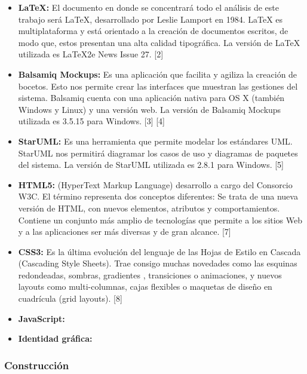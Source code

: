 	\begin{itemize}
		\item \textbf{LaTeX:} El documento en donde se concentrará todo el análisis de este trabajo será LaTeX, desarrollado por Leslie Lamport en 1984. LaTeX es multiplataforma y está orientado a la creación de documentos escritos, de modo que, estos  presentan una alta calidad tipográfica. La versión de LaTeX utilizada es LaTeX2e News Issue 27. [2]
		
		\item \textbf{Balsamiq Mockups:} Es una aplicación que facilita y agiliza la creación de bocetos. Esto nos permite crear las interfaces que muestran las gestiones del sistema. Balsamiq cuenta con una aplicación nativa para OS X (también Windows y Linux) y una versión web. La versión de Balsamiq Mockups utilizada es 3.5.15 para Windows. [3] [4]
		
		\item \textbf{StarUML:} Es una herramienta que permite modelar los estándares UML. StarUML nos permitirá diagramar los casos de uso y diagramas de paquetes del sistema. La versión de StarUML utilizada es 2.8.1 para Windows. [5]
		
		\item \textbf{HTML5:} (HyperText Markup Language) desarrollo a cargo del Consorcio W3C. El término representa dos conceptos diferentes: Se trata de una nueva versión de HTML, con nuevos elementos, atributos y comportamientos. Contiene un conjunto más amplio de tecnologías que permite a los sitios Web y a las aplicaciones ser más diversas y de gran alcance. [7]
		
		\item \textbf{CSS3:} Es la última evolución del lenguaje de las Hojas de Estilo en Cascada (Cascading Style Sheets). Trae consigo muchas novedades como las esquinas redondeadas, sombras, gradientes , transiciones o animaciones, y nuevos layouts como multi-columnas, cajas flexibles o maquetas de diseño en cuadrícula (grid layouts). [8]
		
		\item \textbf{JavaScript:}
		
		\item \textbf{Identidad gráfica:}
		
	\end{itemize}
	
	\subsubsection{Construcción}
	
